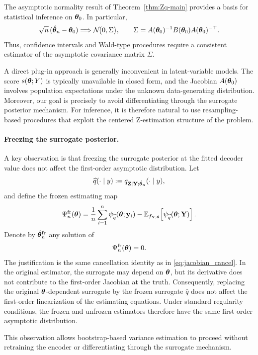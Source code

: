 \documentclass[twoside,11pt]{article}
\begin{document}
The asymptotic normality result of Theorem~\ref{thm:Zq-main} provides a basis for statistical inference on \({\bm{\theta}}_0\). In particular,
\[
\sqrt{n}\,(\hat{{\bm{\theta}}}_n-{\bm{\theta}}_0)
\Longrightarrow
\mathcal N\!\bigl(0,\Sigma\bigr),
\qquad
\Sigma
=
A({\bm{\theta}}_0)^{-1}B({\bm{\theta}}_0)A({\bm{\theta}}_0)^{-\top}.
\]
Thus, confidence intervals and Wald-type procedures require a consistent estimator of the asymptotic covariance matrix \(\Sigma\).

A direct plug-in approach is generally inconvenient in latent-variable models. The score \(s({\bm{\theta}};Y)\) is typically unavailable in closed form, and the Jacobian \(A({\bm{\theta}}_0)\) involves population expectations under the unknown data-generating distribution. Moreover, our goal is precisely to avoid differentiating through the surrogate posterior mechanism. For inference, it is therefore natural to use resampling-based procedures that exploit the centered Z-estimation structure of the problem.

\paragraph{Freezing the surrogate posterior.}
A key observation is that freezing the surrogate posterior at the fitted decoder value does not affect the first-order asymptotic distribution. Let
\[
\widehat q(\cdot\mid y)
:=
q_{{\bf Z}\mid{\bf Y};\hat{{\bm{\theta}}}_n}(\cdot\mid y),
\]
and define the frozen estimating map
\[
\Psi_n^{\mathrm{fr}}({\bm{\theta}})
=
\frac{1}{n}\sum_{i=1}^n \psi_{\widehat q}({\bm{\theta}};{\bf y}_i)
-
\mathbb E_{f_{{\bf Y};{\bm{\theta}}}}\!\left[\psi_{\widehat q}({\bm{\theta}};{\bf Y})\right].
\]
Denote by \(\hat{{\bm{\theta}}}_n^{\mathrm{fr}}\) any solution of
\[
\Psi_n^{\mathrm{fr}}({\bm{\theta}})=0.
\]
The justification is the same cancellation identity as in \eqref{eq:jacobian_cancel}. In the original estimator, the surrogate may depend on \({\bm{\theta}}\), but its derivative does not contribute to the first-order Jacobian at the truth. Consequently, replacing the original \({\bm{\theta}}\)-dependent surrogate by the frozen surrogate \(\widehat q\) does not affect the first-order linearization of the estimating equations. Under standard regularity conditions, the frozen and unfrozen estimators therefore have the same first-order asymptotic distribution.

This observation allows bootstrap-based variance estimation to proceed without retraining the encoder or differentiating through the surrogate mechanism.
\end{document}
